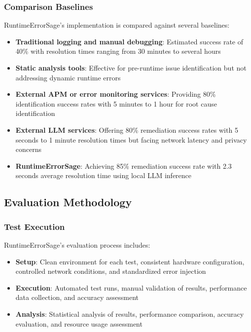 \subsubsection{Comparison Baselines}
RuntimeErrorSage's implementation is compared against several baselines:

\begin{itemize}
\item \textbf{Traditional logging and manual debugging}: Estimated success rate of 40\% with resolution times ranging from 30 minutes to several hours
\item \textbf{Static analysis tools}: Effective for pre-runtime issue identification but not addressing dynamic runtime errors
\item \textbf{External APM or error monitoring services}: Providing 80\% identification success rates with 5 minutes to 1 hour for root cause identification
\item \textbf{External LLM services}: Offering 80\% remediation success rates with 5 seconds to 1 minute resolution times but facing network latency and privacy concerns~\cite{cloud_llm_latency_2022}
\item \textbf{RuntimeErrorSage}: Achieving 85\% remediation success rate with 2.3 seconds average resolution time using local LLM inference
\end{itemize}

\subsection{Evaluation Methodology}

\subsubsection{Test Execution}
RuntimeErrorSage's evaluation process includes:

\begin{itemize}
\item \textbf{Setup}: Clean environment for each test, consistent hardware configuration, controlled network conditions, and standardized error injection
\item \textbf{Execution}: Automated test runs, manual validation of results, performance data collection, and accuracy assessment
\item \textbf{Analysis}: Statistical analysis of results, performance comparison, accuracy evaluation, and resource usage assessment
\end{itemize}

